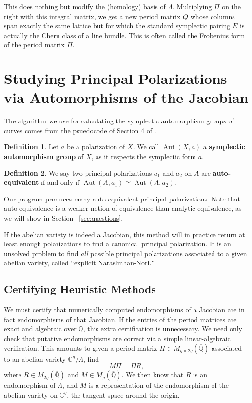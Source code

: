 \documentclass[12pt,reqno]{amsart}
\DeclareMathOperator{\Aut}{Aut}
\newcommand{\C}{\mathbb{C}}
\newcommand{\Q}{\mathbb{Q}}
\theoremstyle{definition}
\newtheorem{defn}{Definition}
\theoremstyle{remark}
\begin{document}
This does nothing but modify the (homology) basis of $\Lambda$. Multiplying $\Pi$ on the right with this integral matrix, we get a new period matrix $Q$ whose columns span exactly the same lattice but for which the standard symplectic pairing $E$ is actually the Chern class of a line bundle. This is often called the Frobenius form of the period matrix $\Pi$.

\section{Studying Principal Polarizations via Automorphisms of the Jacobian}

The algorithm we use for calculating the symplectic automorphism groups of curves comes from the psuedocode of Section 4 of \cite{numerical}. 

\begin{defn} Let $a$ be a polarization of $X$. We call $\Aut(X, a)$ a \textbf{symplectic automorphism group} of $X$, as it respects the symplectic form $a$. 
\end{defn}

\begin{defn} We say two principal polarizations $a_1$ and $a_2$ on $A$ are \textbf{auto-equivalent} if and only if $\Aut(A, a_1) \simeq \Aut(A, a_2)$. \end{defn}

Our program produces many auto-equivalent principal polarizations.  Note that auto-equivalence is a weaker notion of equivalence than analytic equivalence, as we will show in Section ~\ref{sec:questions}. 

If the abelian variety is indeed a Jacobian, this method will in practice return at least enough polarizations to find a canonical principal polarization. It is an unsolved problem to find \textit{all} possible principal polarizations associated to a given abelian variety, called ``explicit Narasimhan-Nori."

\subsection{Certifying Heuristic Methods}
\label{sec:cert}

We must certify that numerically computed endomorphisms of a Jacobian are in fact endomorphisms of that Jacobian. If the entries of the period matrices are exact and algebraic over $\Q$, this extra certification is unnecessary. We need only check that putative endomorphisms are correct via a simple linear-algebraic verification. This amounts to given a period matrix $\Pi \in M_{g \times 2g}(\overline{\Q})$ associated to an abelian variety $\C^g/\Lambda$, find
$$M \Pi = \Pi R,$$
where $R \in  M_{2g}(\overline{\Q})$ and $M \in M_{g}(\overline{\Q})$. We then know that $R$ is an endomorphism of $\Lambda$, and $M$ is a representation of the endomorphism of the abelian variety on $\C^g$, the tangent space around the origin.
\end{document}
